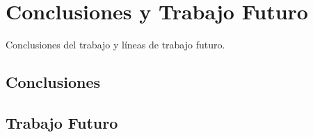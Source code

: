 \chapter{Conclusiones y Trabajo Futuro}
\label{cap:conclusionesyFuturo}

Conclusiones del trabajo y líneas de trabajo futuro.

\section{Conclusiones}
\label{cap:sec:conclusiones}


\section{Trabajo Futuro}
\label{cap:sec:TrabajoFuturo}



